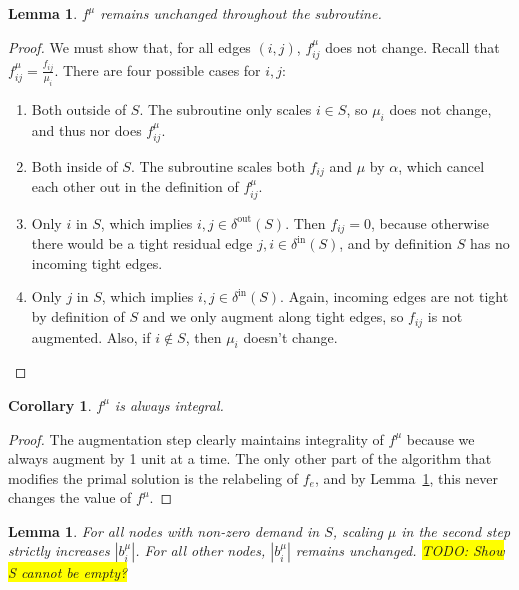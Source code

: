 \documentclass[11pt]{article}
\newtheorem{corollary}{Corollary}[theorem]
\newtheorem{lemma}[theorem]{Lemma}
\theoremstyle{definition}
\theoremstyle{definition}
\newcommand{\biu}{b_{i}^{\mu}}
\newcommand{\din}{\delta^{\text{in}}}
\newcommand{\dout}{\delta^{\text{out}}}
\newcommand{\fiju}{f_{ij}^{\mu}}
\newcommand{\todo}[1]{\colorbox{yellow}{TODO: #1}}
\begin{document}
\begin{lemma}
$f^{\mu}$ remains unchanged throughout the subroutine.
\label{lem:fsame}
\end{lemma} 
\begin{proof}
	We must show that, for all edges $(i,j)$, $f_{ij}^{\mu}$ does not change.
	Recall that $f_{ij}^{\mu} = \frac{f_{ij}}{\mu_i}$. There
	are four possible cases for $i,j$:
	\begin{enumerate}
		\item Both outside of $S$. The subroutine only scales $i \in S$, so $\mu_i$ 
			does not change, and thus nor does $\fiju$.
		\item Both inside of $S$. The subroutine scales both $f_{ij}$ and $\mu$ by
			$\alpha$, which cancel each other out in the definition of $\fiju$.
		\item Only $i$ in $S$, which implies $i,j \in \dout(S)$. Then $f_{ij}=0$,
			because otherwise there would be a tight residual edge $j,i \in \din(S)$,
			and by definition $S$ has no incoming tight edges.
		\item Only $j$ in $S$, which implies $i,j \in \din(S)$. Again, incoming edges
			are not tight by definition of $S$ and we only augment along tight edges,
			so $f_{ij}$ is not augmented. Also, if $i \notin S$, then $\mu_i$ doesn't
			change.
	\end{enumerate}
\end{proof}
\begin{corollary}
$f^{\mu}$ is always integral.
\end{corollary}
\begin{proof}
The augmentation step clearly maintains integrality of $f^{\mu}$ because we
always augment by 1 unit at a time. The only other part of the algorithm that
modifies the primal solution is the relabeling of $f_e$, and by
Lemma~\ref{lem:fsame}, this never changes the value of $f^{\mu}$.
\end{proof}
\begin{lemma}
	\label{lem:scaling}
	For all nodes with non-zero demand in $S$, scaling $\mu$ in the second step
	strictly increases $|\biu|$. For all other nodes, $|\biu|$ remains unchanged.
	\todo{Show S cannot be empty?}
\end{lemma}
\end{document}
